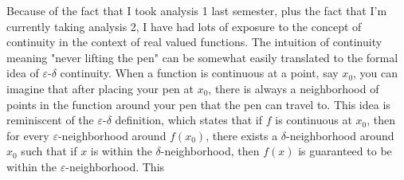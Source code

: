 \documentclass[11pt]{article}
\newcommand{\e}{\varepsilon}
\begin{document}
\pagestyle{fancy}
\fancyhead{}

\normalsize

Because of the fact that I took analysis 1 last semester, plus the fact that I'm currently taking analysis 2, I have had lots of exposure to the concept of continuity in the context of real valued functions. The intuition of continuity meaning "never lifting the pen" can be somewhat easily translated to the formal idea of $\e$-$\delta$ continuity. When a function is continuous at a point, say $x_0$, you can imagine that after placing your pen at $x_0$, there is always a neighborhood of points in the function around your pen that the pen can travel to. This idea is reminiscent of the $\e$-$\delta$ definition, which states that if $f$ is continuous at $x_0$, then for every $\e$-neighborhood around $f(x_0)$, there exists a $\delta$-neighborhood around $x_0$ such that if $x$ is within the $\delta$-neighborhood, then $f(x)$ is guaranteed to be within the $\e$-neighborhood. This 
\end{document}
